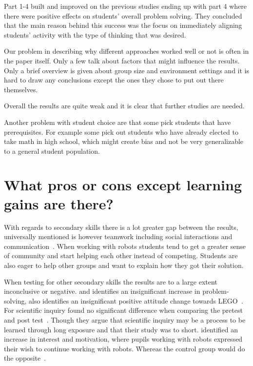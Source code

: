 \bigskip\noindent
Part 1-4 built and improved on the previous studies ending up with part 4 where there were positive effects on students' overall problem solving. They concluded that the main reason behind this success was the focus on immediately aligning students' activity with the type of thinking that was desired.

\bigskip\noindent
Our problem in describing why different approaches worked well or not is often in the paper itself. Only a few talk about factors that might influence the results. Only a brief overview is given about group size and environment settings and it is hard to draw any conclusions except the ones they chose to put out there themselves. 

\bigskip\noindent
Overall the results are quite weak and it is clear that further studies are needed.

\bigskip\noindent
Another problem with student choice are that some pick students that have prerequisites. For example some pick out students who have already elected to take math in high school, which might create bias and not be very generalizable to a general student population.

\section{What pros or cons except learning gains are there?}

With regards to secondary skills there is a lot greater gap between the results, 
universally mentioned is however teamwork including social interactions and communication~\cite{mitnik2008autonomous,mitnik2009collaborative,nugent2009use,owens2008lego}.
When working with robots students tend to get a greater sense of community and start helping each other instead of competing. Students are also eager to help other groups and want to explain how they got their solution.

\bigskip\noindent
When testing for other secondary skills the results are to a large extent inconclusive or negative. 
\citeauthor{hussain2006effect} and \citeauthor{lindh2007does} identifies an insignificant increase  in problem-solving, \citeauthor{hussain2006effect} also identifies an insignificant positive attitude change towards LEGO~\cite{hussain2006effect,lindh2007does}. 
For scientific inquiry \citeauthor{williams2007acquisition} found no significant difference when comparing the pretest and post test~\cite{williams2007acquisition}. 
Though they argue that scientific inquiry may be a process to be learned through long exposure and that their study was to short.
 identified an increase in interest and motivation, where pupils working with robots expressed their wish to continue working with robots. Whereas the control group would do the opposite~\cite{nugent2008effect}. 

